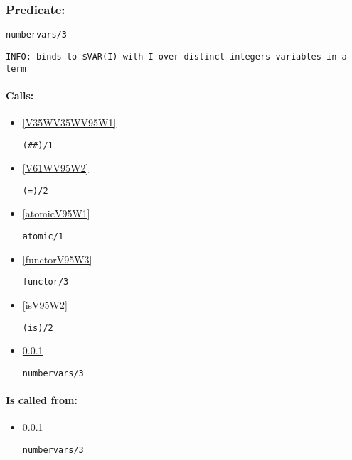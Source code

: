 \subsubsection{Predicate:} \label{numbervarsV95W3}

\begin{verbatim}
numbervars/3
\end{verbatim}

{\small \begin{verbatim}
INFO: binds to $VAR(I) with I over distinct integers variables in a term

\end{verbatim}}
\paragraph{Calls:} 
\begin{itemize}
\item \ref{V35WV35WV95W1} 
\begin{verbatim}
(##)/1
\end{verbatim}

\item \ref{V61WV95W2} 
\begin{verbatim}
(=)/2
\end{verbatim}

\item \ref{atomicV95W1} 
\begin{verbatim}
atomic/1
\end{verbatim}

\item \ref{functorV95W3} 
\begin{verbatim}
functor/3
\end{verbatim}

\item \ref{isV95W2} 
\begin{verbatim}
(is)/2
\end{verbatim}

\item \ref{numbervarsV95W3} 
\begin{verbatim}
numbervars/3
\end{verbatim}

\end{itemize}
\paragraph{Is called from:} 
\begin{itemize}
\item \ref{numbervarsV95W3} 
\begin{verbatim}
numbervars/3
\end{verbatim}

\end{itemize}

